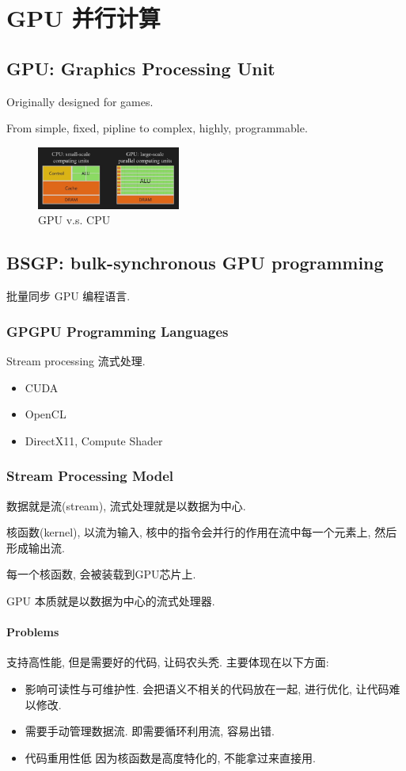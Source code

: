 \newpage
\section{GPU 并行计算}
\subsection{GPU: Graphics Processing Unit}
Originally designed for games.

From simple, fixed, pipline to complex, highly, programmable.

\begin{figure}[!htb]
    \centering
    \includegraphics[width=0.42\textwidth]{pic/ACG7/GPU v.s. CPU.png}
    \caption{GPU v.s. CPU}
\end{figure}


\subsection{BSGP: bulk-synchronous GPU programming}
批量同步 GPU 编程语言.

\subsubsection{GPGPU Programming Languages}
Stream processing 流式处理. 
\begin{itemize}
    \item CUDA
    \item OpenCL
    \item DirectX11, Compute Shader
\end{itemize}

\subsubsection{Stream Processing Model}

数据就是流(stream), 流式处理就是以数据为中心.

核函数(kernel), 以流为输入, 核中的指令会并行的作用在流中每一个元素上, 然后形成输出流.

每一个核函数, 会被装载到GPU芯片上.

GPU 本质就是以数据为中心的流式处理器.

\paragraph{Problems}支持高性能, 但是需要好的代码, 让码农头秃. 主要体现在以下方面: 
\begin{itemize}
    \item 影响可读性与可维护性. 
    \subitem 会把语义不相关的代码放在一起, 进行优化, 让代码难以修改. 
    \item 需要手动管理数据流. 
    \subitem 即需要循环利用流, 容易出错.
    \item 代码重用性低
    \subitem 因为核函数是高度特化的, 不能拿过来直接用. 
\end{itemize}

